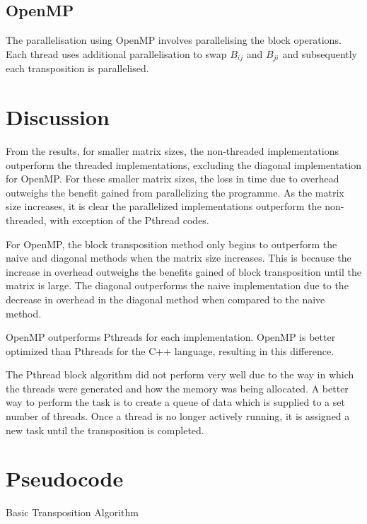 \documentclass[a4paper,10pt]{article}
\begin{document}
\subsection{OpenMP}
The parallelisation using OpenMP involves parallelising the block operations. Each thread uses additional parallelisation to swap $B_{ij}$ and $B_{ji}$ and subsequently each transposition is parallelised. 

\section{Discussion}

From the results, for smaller matrix sizes, the non-threaded implementations outperform the threaded implementations, excluding the diagonal implementation for OpenMP.
For these smaller matrix sizes, the loss in time due to overhead outweighs the benefit gained from parallelizing the programme.
As the matrix size increases, it is clear the parallelized implementations outperform the non-threaded, with exception of the Pthread codes.

For OpenMP, the block transposition method only begins to outperform the naive and diagonal methods when the matrix size increases.
This is because the increase in overhead outweighs the benefits gained of block transposition until the matrix is large.
The diagonal outperforms the naive implementation due to the decrease in overhead in the diagonal method when compared to the naive method. 

OpenMP outperforms Pthreads for each implementation.
OpenMP is better optimized than Pthreads for the C++ language, resulting in this difference.

The Pthread block algorithm did not perform very well due to the way in which the threads were generated and how the memory was being allocated. A better way to perform the task is to create a queue of data which is supplied to a set number of threads. Once a thread is no longer actively running, it is assigned a new task until the transposition is completed. 

\section{Pseudocode}


\begin{algorithm}[H]
	\SetAlgoLined
\caption{Basic Transposition Algorithm}
\end{algorithm}
\end{document}
